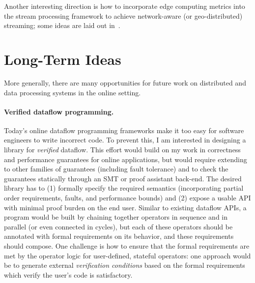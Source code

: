 Another interesting direction is how to incorporate edge computing metrics into the stream processing framework to achieve network-aware (or geo-distributed) streaming; some ideas are laid out in~.

\section{Long-Term Ideas}

More generally, there are many opportunities for future work on distributed and data processing systems in the online setting.

\paragraph{Verified dataflow programming.}
Today's online dataflow programming frameworks
make it too easy for software engineers to write incorrect code.
To prevent this, I am interested in designing a library for \emph{verified} dataflow.
This effort would build on my work in correctness and performance guarantees for online applications, but would require extending to other families of guarantees (including fault tolerance) and to check the guarantees statically through an SMT or proof assistant back-end.
The desired library has to (1) formally specify the required semantics (incorporating partial order requirements, faults, and performance bounds) and (2) expose a usable API with minimal proof burden on the end user.
Similar to existing dataflow APIs, a program would be built by chaining together operators in sequence and in parallel (or even connected in cycles),
but each of these operators should be annotated with formal requirements on its behavior, and these requirements should compose.
One challenge is how to ensure that the formal requirements are met by the operator logic for user-defined, stateful operators: one approach would be to generate external \emph{verification conditions} based on the formal requirements which verify the user's code is satisfactory.

